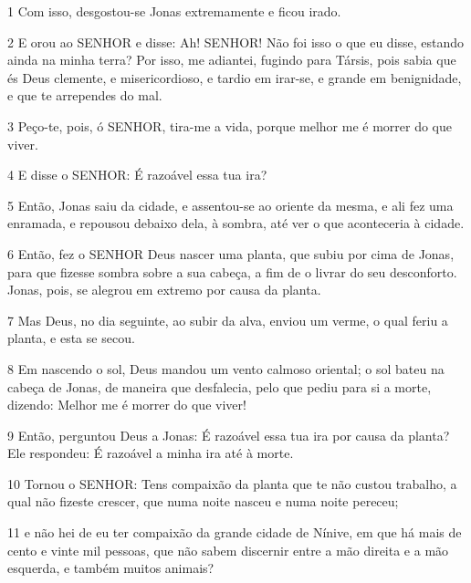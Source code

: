 \par 1 Com isso, desgostou-se Jonas extremamente e ficou irado.
\par 2 E orou ao SENHOR e disse: Ah! SENHOR! Não foi isso o que eu disse, estando ainda na minha terra? Por isso, me adiantei, fugindo para Társis, pois sabia que és Deus clemente, e misericordioso, e tardio em irar-se, e grande em benignidade, e que te arrependes do mal.
\par 3 Peço-te, pois, ó SENHOR, tira-me a vida, porque melhor me é morrer do que viver.
\par 4 E disse o SENHOR: É razoável essa tua ira?
\par 5 Então, Jonas saiu da cidade, e assentou-se ao oriente da mesma, e ali fez uma enramada, e repousou debaixo dela, à sombra, até ver o que aconteceria à cidade.
\par 6 Então, fez o SENHOR Deus nascer uma planta, que subiu por cima de Jonas, para que fizesse sombra sobre a sua cabeça, a fim de o livrar do seu desconforto. Jonas, pois, se alegrou em extremo por causa da planta.
\par 7 Mas Deus, no dia seguinte, ao subir da alva, enviou um verme, o qual feriu a planta, e esta se secou.
\par 8 Em nascendo o sol, Deus mandou um vento calmoso oriental; o sol bateu na cabeça de Jonas, de maneira que desfalecia, pelo que pediu para si a morte, dizendo: Melhor me é morrer do que viver!
\par 9 Então, perguntou Deus a Jonas: É razoável essa tua ira por causa da planta? Ele respondeu: É razoável a minha ira até à morte.
\par 10 Tornou o SENHOR: Tens compaixão da planta que te não custou trabalho, a qual não fizeste crescer, que numa noite nasceu e numa noite pereceu;
\par 11 e não hei de eu ter compaixão da grande cidade de Nínive, em que há mais de cento e vinte mil pessoas, que não sabem discernir entre a mão direita e a mão esquerda, e também muitos animais?


